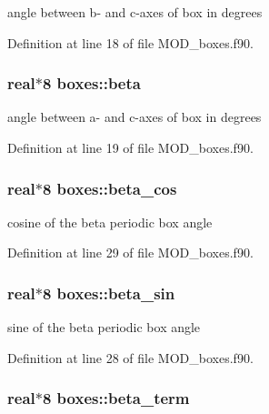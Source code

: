 angle between b-\/ and c-\/axes of box in degrees 



Definition at line 18 of file M\-O\-D\-\_\-boxes.\-f90.

\hypertarget{classboxes_af8ca3edf3656e0bb9681c3e0a38bc1df}{
\subsubsection[{beta}]{\setlength{\rightskip}{0pt plus 5cm}real$\ast$8 boxes\-::beta}}\label{classboxes_af8ca3edf3656e0bb9681c3e0a38bc1df}


angle between a-\/ and c-\/axes of box in degrees 



Definition at line 19 of file M\-O\-D\-\_\-boxes.\-f90.

\hypertarget{classboxes_aee0f306c8bcf447b74d6e054c4696f10}{
\subsubsection[{beta\-\_\-cos}]{\setlength{\rightskip}{0pt plus 5cm}real$\ast$8 boxes\-::beta\-\_\-cos}}\label{classboxes_aee0f306c8bcf447b74d6e054c4696f10}


cosine of the beta periodic box angle 



Definition at line 29 of file M\-O\-D\-\_\-boxes.\-f90.

\hypertarget{classboxes_ae19ef077f562e95e2055473c08fa5476}{
\subsubsection[{beta\-\_\-sin}]{\setlength{\rightskip}{0pt plus 5cm}real$\ast$8 boxes\-::beta\-\_\-sin}}\label{classboxes_ae19ef077f562e95e2055473c08fa5476}


sine of the beta periodic box angle 



Definition at line 28 of file M\-O\-D\-\_\-boxes.\-f90.

\hypertarget{classboxes_a6e45e0501eda9170b0c3c2774708b14f}{
\subsubsection[{beta\-\_\-term}]{\setlength{\rightskip}{0pt plus 5cm}real$\ast$8 boxes\-::beta\-\_\-term}}\label{classboxes_a6e45e0501eda9170b0c3c2774708b14f}


